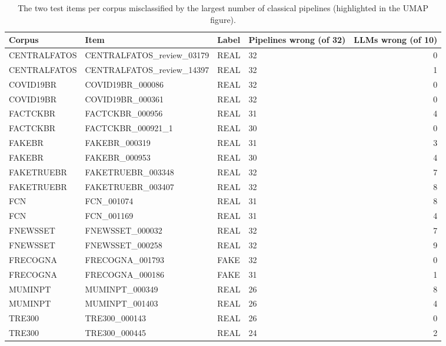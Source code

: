 \begin{table}[t]
\centering
\scriptsize
\caption{The two test items per corpus misclassified by the largest number of classical pipelines (highlighted in the UMAP figure).}
\label{tab:b-hard-examples}
\begin{tabular}{llllr}
\toprule
Corpus & Item & Label & Pipelines wrong (of 32) & LLMs wrong (of 10) \\
\midrule
CENTRALFATOS & CENTRALFATOS\_review\_03179 & REAL & 32 & 0 \\
CENTRALFATOS & CENTRALFATOS\_review\_14397 & REAL & 32 & 1 \\
COVID19BR & COVID19BR\_000086 & REAL & 32 & 0 \\
COVID19BR & COVID19BR\_000361 & REAL & 32 & 0 \\
FACTCKBR & FACTCKBR\_000956 & REAL & 31 & 4 \\
FACTCKBR & FACTCKBR\_000921\_1 & REAL & 30 & 0 \\
FAKEBR & FAKEBR\_000319 & REAL & 31 & 3 \\
FAKEBR & FAKEBR\_000953 & REAL & 30 & 4 \\
FAKETRUEBR & FAKETRUEBR\_003348 & REAL & 32 & 7 \\
FAKETRUEBR & FAKETRUEBR\_003407 & REAL & 32 & 8 \\
FCN & FCN\_001074 & REAL & 31 & 8 \\
FCN & FCN\_001169 & REAL & 31 & 4 \\
FNEWSSET & FNEWSSET\_000032 & REAL & 32 & 7 \\
FNEWSSET & FNEWSSET\_000258 & REAL & 32 & 9 \\
FRECOGNA & FRECOGNA\_001793 & FAKE & 32 & 0 \\
FRECOGNA & FRECOGNA\_000186 & FAKE & 31 & 1 \\
MUMINPT & MUMINPT\_000349 & REAL & 26 & 8 \\
MUMINPT & MUMINPT\_001403 & REAL & 26 & 4 \\
TRE300 & TRE300\_000143 & REAL & 26 & 0 \\
TRE300 & TRE300\_000445 & REAL & 24 & 2 \\
\bottomrule
\end{tabular}
\end{table}
